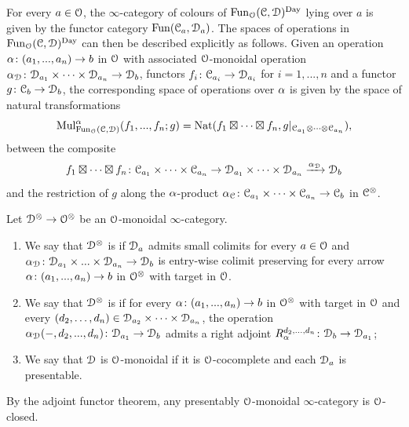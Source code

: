 For every $a \in \mathcal{O}$, the $\infty$-category of colours of $\operatorname{Fun}_{\mathcal{O}}(\mathcal C,\mathcal{D})^{\mathrm{Day}}$ lying over $a$ is given by the functor category $\operatorname{Fun}(\mathcal C_a,\mathcal{D}_a)$. The spaces of operations in $\operatorname{Fun}_{\mathcal{O}}(\mathcal C,\mathcal{D})^{\mathrm{Day}}$ can then be described explicitly as follows. Given an operation $\alpha\colon (a_1,...,a_n) \to b$ in $\mathcal{O}$ with associated $\mathcal{O}$-monoidal operation $\alpha_{\mathcal{D}}\colon \mathcal{D}_{a_1} \times \dots \times \mathcal{D}_{a_n} \to \mathcal{D}_b$, functors $f_i\colon \mathcal C_{a_i} \to \mathcal{D}_{a_i}$ for $i=1,...,n$ and a functor $g \colon \mathcal C_b \to \mathcal{D}_b$, the corresponding space of operations over $\alpha$ is given by the space of natural transformations
\[
\mathrm{Mul}^{\alpha}_{\operatorname{Fun}_{\mathcal{O}}(\mathcal C,\mathcal{D})}(f_1,...,f_n;g) = \operatorname{Nat}(f_1 \boxtimes \dots \boxtimes f_n,g|_{\mathcal C_{a_1} \otimes \dots \otimes \mathcal C_{a_n}} ),
\]
between the composite 
\[
f_1 \boxtimes \dots \boxtimes f_n\colon \mathcal C_{a_1} \times \dots \times \mathcal C_{a_n} \to \mathcal{D}_{a_1} \times \dots \times \mathcal{D}_{a_n} \xrightarrow{\alpha_{\mathcal{D}}} \mathcal{D}_b
\]
and the restriction of $g$ along the $\alpha$-product
$\alpha_{\mathcal C}\colon \mathcal C_{a_1} \times \dots \times \mathcal C_{a_n} \to \mathcal C_{b}$ in $\mathcal C^{\otimes}$. %



\begin{definition}
\label{definition:cocomplete}%
Let $\mathcal{D}^{\otimes} \to \mathcal{O}^{\otimes}$ be an $\mathcal{O}$-monoidal $\infty$-category.  
\begin{enumerate}
\item
We say that $\mathcal{D}^{\otimes}$ is  if $\mathcal{D}_a$ admits small colimits for every $a \in \mathcal{O}$ and $\alpha_{\mathcal{D}}\colon \mathcal{D}_{a_1} \times ... \times \mathcal{D}_{a_n} \to \mathcal{D}_b$ is entry-wise colimit preserving 
for every arrow $\alpha\colon (a_1,...,a_n) \to b$ in $\mathcal{O}^{\otimes}$ with target in $\mathcal{O}$.
\item
We say that $\mathcal{D}^{\otimes}$ is  if for every $\alpha\colon (a_1,...,a_n) \to b$ in $\mathcal{O}^{\otimes}$ with target in $\mathcal{O}$ and every $(d_2,\dots,d_n) \in \mathcal{D}_{a_2} \times \dots \times \mathcal{D}_{a_n}$, the operation $\alpha_{\mathcal{D}}(-,d_2,...,d_n)\colon \mathcal{D}_{a_1} \to \mathcal{D}_b$ admits a right adjoint $R^{d_2,...,d_n}_{\alpha}\colon \mathcal{D}_b \to \mathcal{D}_{a_1}$;
\item We say that $\mathcal{D}$ is  $\mathcal{O}$-monoidal if it is $\mathcal{O}$-cocomplete and each $\mathcal{D}_a$ is presentable.
\end{enumerate} 
\end{definition}

By the adjoint functor theorem, any presentably $\mathcal{O}$-monoidal $\infty$-category is $\mathcal{O}$-closed. 





